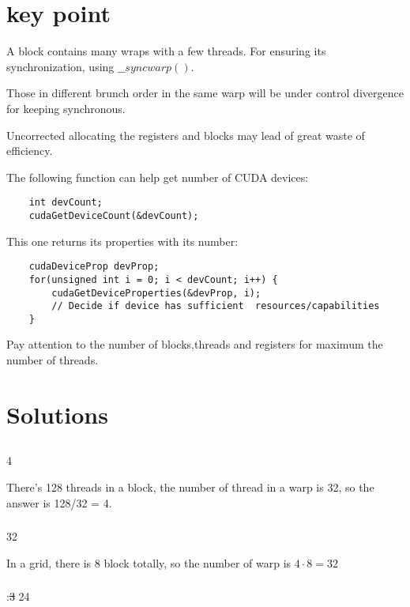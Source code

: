 \documentclass{article}
\begin{document}
\section*{key point}
A block contains many wraps with a few threads.
For ensuring its synchronization, using \(\_\_syncwarp()\).

Those in different brunch order in the same warp will be under control divergence for keeping synchronous.

Uncorrected allocating the registers and blocks may lead of great waste of efficiency. 

The following function can help get number of CUDA devices:
\begin{lstlisting}
    int devCount;
    cudaGetDeviceCount(&devCount);
\end{lstlisting}

This one returns its properties with its number:
\begin{lstlisting}
    cudaDeviceProp devProp;
    for(unsigned int i = 0; i < devCount; i++) {
        cudaGetDeviceProperties(&devProp, i);
        // Decide if device has sufficient  resources/capabilities 
    }
\end{lstlisting}

Pay attention to the number of blocks,threads and registers for maximum the number of threads.

\section{Solutions}
\subsection{}
\subsubsection{}
4

There's 128 threads in a block, the number of thread in a warp is 32, so the answer is 128/32 = 4.
\subsubsection{}
32

In a grid, there is 8 block totally, so the number of warp is \(4\cdot8=32\)

\subsubsection{}
:\sout{3} 24
\end{document}
